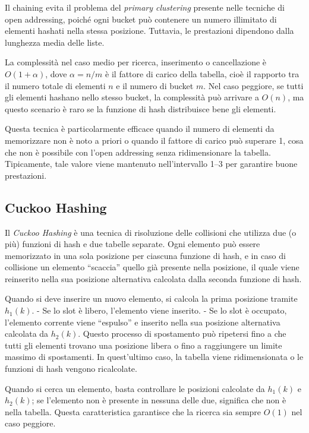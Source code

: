Il chaining evita il problema del \textit{primary clustering} presente nelle tecniche di open addressing, poiché ogni bucket può 
contenere un numero illimitato di elementi hashati nella stessa posizione. Tuttavia, le prestazioni dipendono dalla lunghezza media delle liste.

La complessità nel caso medio per ricerca, inserimento o cancellazione è $O(1 + \alpha)$, dove $\alpha = n/m$ è il fattore di carico della tabella, 
cioè il rapporto tra il numero totale di elementi $n$ e il numero di bucket $m$. Nel caso peggiore, se tutti gli elementi hashano nello 
stesso bucket, la complessità può arrivare a $O(n)$, ma questo scenario è raro se la funzione di hash distribuisce bene gli elementi.

Questa tecnica è particolarmente efficace quando il numero di elementi da memorizzare non è noto a priori o quando il fattore di carico 
può superare 1, cosa che non è possibile con l’open addressing senza ridimensionare la tabella. Tipicamente, tale valore viene mantenuto 
nell’intervallo 1–3 per garantire buone prestazioni.

\subsection{Cuckoo Hashing}

Il \textit{Cuckoo Hashing} è una tecnica di risoluzione delle collisioni che utilizza due (o più) funzioni di hash e due tabelle separate. 
Ogni elemento può essere memorizzato in una sola posizione per ciascuna funzione di hash, e in caso di collisione un elemento “scaccia” quello 
già presente nella posizione, il quale viene reinserito nella sua posizione alternativa calcolata dalla seconda funzione di hash.

Quando si deve inserire un nuovo elemento, si calcola la prima posizione tramite $h_1(k)$.  
- Se lo slot è libero, l’elemento viene inserito.  
- Se lo slot è occupato, l’elemento corrente viene “espulso” e inserito nella sua posizione alternativa calcolata da $h_2(k)$.  
Questo processo di spostamento può ripetersi fino a che tutti gli elementi trovano una posizione libera o fino a raggiungere un limite massimo di spostamenti.  
In quest’ultimo caso, la tabella viene ridimensionata o le funzioni di hash vengono ricalcolate.

Quando si cerca un elemento, basta controllare le posizioni calcolate da $h_1(k)$ e $h_2(k)$; se l’elemento non è presente in nessuna delle due, 
significa che non è nella tabella. Questa caratteristica garantisce che la ricerca sia sempre $O(1)$ nel caso peggiore.

